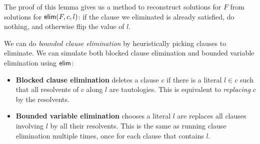 \documentclass[a4paper, 11pt]{article}
\theoremstyle{definition}
\begin{document}
The proof of this lemma gives us a method to reconstruct solutions for $F$ from solutions for $\mathsf{elim}(F,c,l)$: if the clause we eliminated is already satisfied, do nothing, and otherwise flip the value of $l$.

We can do \emph{bounded clause elimination} by heuristically picking clauses to eliminate. We can simulate both blocked clause elimination and bounded variable elimination using $\mathsf{elim}$:

\begin{itemize}
  \item \textbf{Blocked clause elimination} deletes a clause $c$ if there is a literal $l \in c$ such that all resolvents of $c$ along $l$ are tautologies. This is equivalent to \emph{replacing} $c$ by the resolvents.
  \item \textbf{Bounded variable elimination} chooses a literal $l$ are replaces all clauses involving $l$ by all their resolvents. This is the same as running clause elimination multiple times, once for each clause that contains $l$.
\end{itemize}



\end{document}
